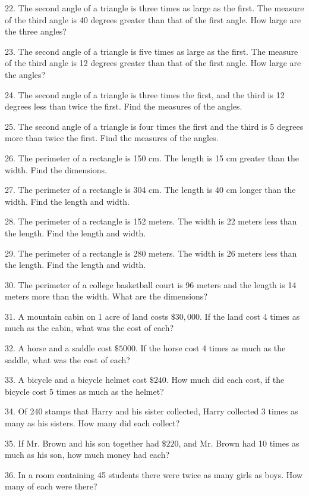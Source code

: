 22. The second angle of a triangle is three times as large as the first. The
measure of the third angle is 40 degrees greater than that of the
first angle. How large are the three angles?

23. The second angle of a triangle is five times as large as the first. The
measure of the third angle is 12 degrees greater than that of
the first angle. How large are the angles?

24. The second angle of a triangle is three times the first, and the third is
12 degrees less than twice the first. Find the
measures of the angles.

25. The second angle of a triangle is four times the first and the third is 5
degrees more than twice the first. Find the measures of the angles.

26. The perimeter of a rectangle is 150 cm. The length is 15 cm greater than
the width. Find the dimensions.

27. The perimeter of a rectangle is 304 cm. The length is 40 cm longer than
the width. Find the length and width.

28. The perimeter of a rectangle is 152 meters. The width is 22 meters less
than the length. Find the length and width.

29. The perimeter of a rectangle is 280 meters. The width is 26 meters less
than the length. Find the length and width.

30. The perimeter of a college basketball court is 96 meters and the length is
14 meters more than the width. What are the dimensions?

31. A mountain cabin on 1 acre of land costs $\$30,000$. If the land
cost 4 times as much as the cabin, what was the cost of each?

32. A horse and a saddle cost $\$5000$. If the horse cost 4 times as
much as the saddle, what was the cost of each?

33. A bicycle and a bicycle helmet cost $\$240$. How much did each
cost, if the bicycle cost 5 times as much as the helmet?

34. Of 240 stamps that Harry and his sister collected, Harry collected 3 times
as many as his sisters. How many did each collect?

35. If Mr. Brown and his son together had $\$220$, and Mr. Brown had
10 times as much as his son, how much money had each?

36. In a room containing 45 students there were twice as many girls as boys.
How many of each were there?

